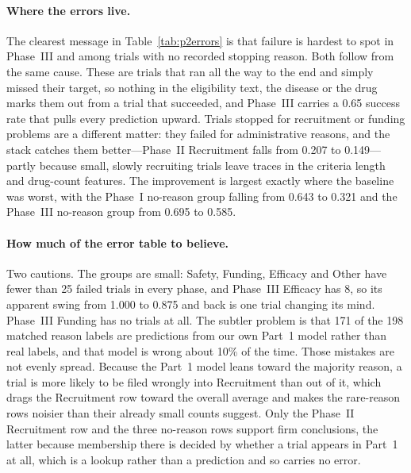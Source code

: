 \paragraph{Where the errors live.}
The clearest message in Table~\ref{tab:p2errors} is that failure is hardest to
spot in Phase~III and among trials with no recorded stopping reason. Both follow
from the same cause. These are trials that ran all the way to the end and simply
missed their target, so nothing in the eligibility text, the disease or the drug
marks them out from a trial that succeeded, and Phase~III carries a 0.65 success
rate that pulls every prediction upward. Trials stopped for recruitment or funding
problems are a different matter: they failed for administrative reasons, and the
stack catches them better---Phase~II Recruitment falls from 0.207 to 0.149---partly
because small, slowly recruiting trials leave traces in the criteria length and
drug-count features. The improvement is largest exactly where the baseline was
worst, with the Phase~I no-reason group falling from 0.643 to 0.321 and the
Phase~III no-reason group from 0.695 to 0.585.

\paragraph{How much of the error table to believe.}
Two cautions. The groups are small: Safety, Funding, Efficacy and Other have fewer
than 25 failed trials in every phase, and Phase~III Efficacy has 8, so its
apparent swing from 1.000 to 0.875 and back is one trial changing its mind.
Phase~III Funding has no trials at all. The subtler problem is that 171 of the 198
matched reason labels are predictions from our own Part~1 model rather than real
labels, and that model is wrong about 10\% of the time. Those mistakes are not
evenly spread. Because the Part~1 model leans toward the majority reason, a trial
is more likely to be filed wrongly into Recruitment than out of it, which drags
the Recruitment row toward the overall average and makes the rare-reason rows
noisier than their already small counts suggest. Only the Phase~II Recruitment row
and the three no-reason rows support firm conclusions, the latter because
membership there is decided by whether a trial appears in Part~1 at all, which is
a lookup rather than a prediction and so carries no error.

